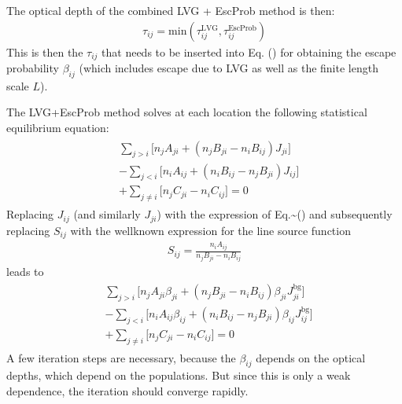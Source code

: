 \documentclass[letterpaper,10pt,english]{sphinxmanual}
\begin{document}
The optical depth of the combined LVG + EscProb method is then:
\begin{equation*}
\begin{split}\tau_{ij} = \mathrm{min}\left(\tau_{ij}^{\mathrm{LVG}},\tau_{ij}^{\mathrm{EscProb}}\right)\end{split}
\end{equation*}
This is then the \(\tau_{ij}\) that needs to be inserted into
Eq. () for obtaining the escape probability
\(\beta_{ij}\) (which includes escape due to LVG as well as the finite
length scale \(L\)).

The LVG+EscProb method solves at each location the following statistical
equilibrium equation:
\begin{equation*}
\begin{split}\begin{split}
& \sum_{j>i} \Big[ n_jA_{ji} + (n_jB_{ji}-n_iB_{ij})J_{ji}\Big]\\
& - \sum_{j<i} \Big[ n_iA_{ij} + (n_iB_{ij}-n_jB_{ji})J_{ij}\Big]\\
& + \sum_{j\neq i}\big[n_jC_{ji}-n_iC_{ij}\big]=0
\end{split}\end{split}
\end{equation*}
Replacing \(J_{ij}\) (and similarly \(J_{ji}\)) with the expression of
Eq.\textasciitilde{}() and subsequently replacing \(S_{ij}\) with
the well\sphinxhyphen{}known expression for the line source function
\begin{equation*}
\begin{split}S_{ij} = \frac{n_iA_{ij}}{n_jB_{ji}-n_iB_{ij}}\end{split}
\end{equation*}
leads to
\begin{equation*}
\begin{split}\begin{split}
& \sum_{j>i} \Big[ n_jA_{ji}\beta_{ji} + (n_jB_{ji}-n_iB_{ij})\beta_{ji}J^{\mathrm{bg}}_{ji}\Big]\\
& - \sum_{j<i} \Big[ n_iA_{ij}\beta_{ij} + (n_iB_{ij}-n_jB_{ji})\beta_{ij}J^{\mathrm{bg}}_{ij}\Big]\\
& + \sum_{j\neq i}\big[n_jC_{ji}-n_iC_{ij}\big]=0
\end{split}\end{split}
\end{equation*}
A few iteration steps are necessary, because the \(\beta_{ij}\) depends on the
optical depths, which depend on the populations. But since this is only a
weak dependence, the iteration should converge rapidly.
\end{document}
